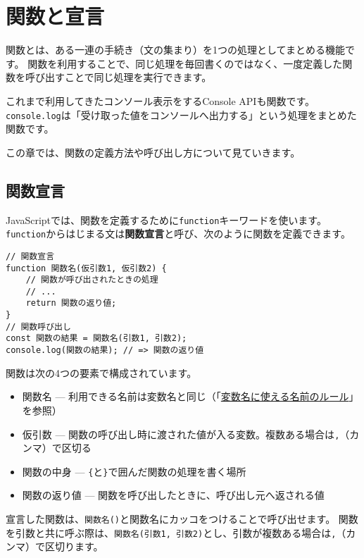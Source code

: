 \hypertarget{function-and-declaration}{%
\chapter{関数と宣言}\label{function-and-declaration}}
\thispagestyle{frontheadings}

関数とは、ある一連の手続き（文の集まり）を1つの処理としてまとめる機能です。
関数を利用することで、同じ処理を毎回書くのではなく、一度定義した関数を呼び出すことで同じ処理を実行できます。

これまで利用してきたコンソール表示をするConsole APIも関数です。
\texttt{console.log}は「受け取った値をコンソールへ出力する」という処理をまとめた関数です。

この章では、関数の定義方法や呼び出し方について見ていきます。

\hypertarget{function-declaration}{%
\section{関数宣言}\label{function-declaration}}

JavaScriptでは、関数を定義するために\texttt{function}キーワードを使います。
\texttt{function}からはじまる文は\textbf{関数宣言}と呼び、次のように関数を定義できます。

\begin{lstlisting}
// 関数宣言
function 関数名(仮引数1, 仮引数2) {
    // 関数が呼び出されたときの処理
    // ...
    return 関数の返り値;
}
// 関数呼び出し
const 関数の結果 = 関数名(引数1, 引数2);
console.log(関数の結果); // => 関数の返り値
\end{lstlisting}

関数は次の4つの要素で構成されています。

\begin{itemize}
\item
  関数名 ---
  利用できる名前は変数名と同じ（「\hyperlink{variable-name}{変数名に使える名前のルール}」を参照）
\item
  仮引数 ---
  関数の呼び出し時に渡された値が入る変数。複数ある場合は\texttt{,}（カンマ）で区切る
\item
  関数の中身 ---
  \texttt{\{}と\texttt{\}}で囲んだ関数の処理を書く場所
\item
  関数の返り値 --- 関数を呼び出したときに、呼び出し元へ返される値
\end{itemize}

宣言した関数は、\texttt{関数名()}と関数名にカッコをつけることで呼び出せます。
関数を引数と共に呼ぶ際は、\texttt{関数名(引数1, 引数2)}とし、引数が複数ある場合は\texttt{,}（カンマ）で区切ります。

